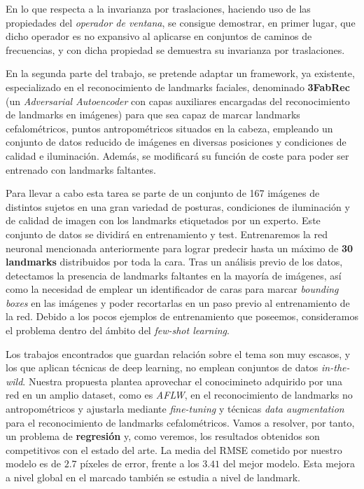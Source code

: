 \medskip

\noindent En lo que respecta a la invarianza por traslaciones, haciendo uso de las propiedades del \textit{operador de ventana}, se consigue demostrar, en primer lugar, que dicho operador es no expansivo al aplicarse en conjuntos de caminos de frecuencias, y con dicha propiedad se demuestra su invarianza por traslaciones.

\medskip

\noindent En la segunda parte del trabajo, se pretende adaptar un framework, ya existente, especializado en el reconocimiento de landmarks faciales, denominado \textbf{3FabRec} (un \textit{Adversarial Autoencoder} con capas auxiliares encargadas del reconocimiento de landmarks en imágenes) para que sea capaz de marcar landmarks cefalométricos, puntos antropométricos situados en la cabeza, empleando un conjunto de datos reducido de imágenes en diversas posiciones y condiciones de calidad e iluminación. Además, se modificará su función de coste para poder ser entrenado con landmarks faltantes.

\medskip

\noindent Para llevar a cabo esta tarea se parte de un conjunto de 167 imágenes de distintos sujetos en una gran variedad de posturas, condiciones de iluminación y de calidad de imagen con los landmarks etiquetados por un experto. Este conjunto de datos se dividirá en entrenamiento y test. Entrenaremos la red neuronal mencionada anteriormente para lograr predecir hasta un máximo de \textbf{30 landmarks} distribuidos por toda la cara. Tras un análisis previo de los datos, detectamos la presencia de landmarks faltantes en la mayoría de imágenes, así como la necesidad de emplear un identificador de caras para marcar \textit{bounding boxes} en las imágenes y poder recortarlas en un paso previo al entrenamiento de la red. Debido a los pocos ejemplos de entrenamiento que poseemos, consideramos el problema dentro del ámbito del \textit{few-shot learning}.

\medskip

\noindent Los trabajos encontrados que guardan relación sobre el tema son muy escasos, y los que aplican técnicas de deep learning, no emplean conjuntos de datos \textit{in-the-wild}. Nuestra propuesta plantea aprovechar el conocimineto adquirido por una red en un amplio dataset, como es \textit{AFLW}, en el reconocimiento de landmarks no antropométricos y ajustarla mediante \textit{fine-tuning}  y técnicas \textit{data augmentation}  para el reconocimiento de landmarks cefalométricos. Vamos a resolver, por tanto, un problema de \textbf{regresión} y, como veremos, los resultados obtenidos son competitivos con el estado del arte. La media del RMSE cometido por nuestro modelo es de $2.7$ píxeles de error, frente a los $3.41$ del mejor modelo. Esta mejora a nivel global en el marcado también se estudia a nivel de landmark.

\endinput
